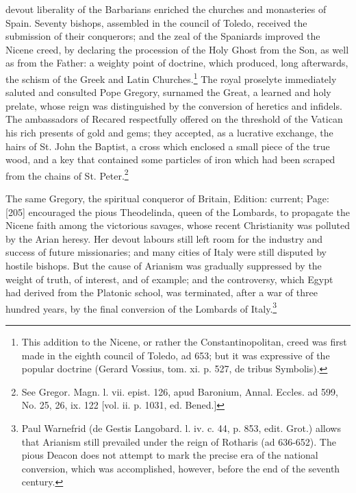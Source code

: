 devout liberality of the Barbarians enriched the churches and monasteries of Spain. Seventy bishops, assembled in the council of Toledo, received the submission of their conquerors; and the zeal of the Spaniards improved the Nicene creed, by declaring the procession of the Holy Ghost from the Son, as well as from the Father: a weighty point of doctrine, which produced, long afterwards, the schism of the Greek and Latin Churches.\footnote{This addition to the Nicene, or rather the Constantinopolitan, creed was first made in the eighth council of Toledo, ad 653; but it was expressive of the popular doctrine (Gerard Vossius, tom. xi. p. 527, de tribus Symbolis).} The royal proselyte immediately saluted and consulted Pope Gregory, surnamed the Great, a learned and holy prelate, whose reign was distinguished by the conversion of heretics and infidels. The ambassadors of Recared respectfully offered on the threshold of the Vatican his rich presents of gold and gems; they accepted, as a lucrative exchange, the hairs of St. John the Baptist, a cross which enclosed a small piece of the true wood, and a key that contained some particles of iron which had been scraped from the chains of St. Peter.\footnote{See Gregor. Magn. l. vii. epist. 126, apud Baronium, Annal. Eccles. ad 599, No. 25, 26, ix. 122 [vol. ii. p. 1031, ed. Bened.]}

The same Gregory, the spiritual conqueror of Britain, Edition: current; Page: [205] encouraged the pious Theodelinda, queen of the Lombards, to propagate the Nicene faith among the victorious savages, whose recent Christianity was polluted by the Arian heresy. Her devout labours still left room for the industry and success of future missionaries; and many cities of Italy were still disputed by hostile bishops. But the cause of Arianism was gradually suppressed by the weight of truth, of interest, and of example; and the controversy, which Egypt had derived from the Platonic school, was terminated, after a war of three hundred years, by the final conversion of the Lombards of Italy.\footnote{Paul Warnefrid (de Gestis Langobard. l. iv. c. 44, p. 853, edit. Grot.) allows that Arianism still prevailed under the reign of Rotharis (ad 636-652). The pious Deacon does not attempt to mark the precise era of the national conversion, which was accomplished, however, before the end of the seventh century.}

